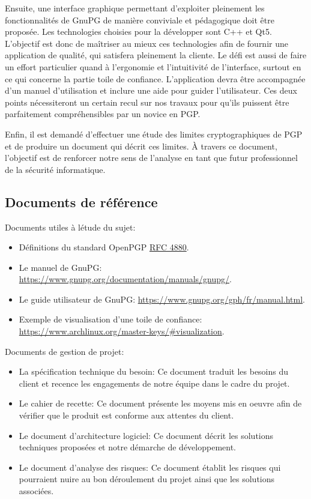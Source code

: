 \documentclass{../res/univ-projet}
\begin{document}
Ensuite, une interface graphique permettant d'exploiter pleinement les fonctionnalités de GnuPG de manière conviviale et pédagogique doit être 
proposée. Les technologies choisies pour la développer sont C++ et Qt5. L'objectif est donc de maîtriser au mieux ces technologies afin 
de fournir une application de qualité, qui satisfera pleinement la cliente. Le défi est aussi de faire un effort particulier quand à l'ergonomie 
et l'intuitivité de l'interface, surtout en ce qui concerne la partie toile de confiance. L'application devra être accompagnée d'un manuel 
d'utilisation et inclure une aide pour guider l'utilisateur. Ces deux points nécessiteront un certain recul sur nos travaux pour qu'ils 
puissent être parfaitement compréhensibles par un novice en PGP.

Enfin, il est demandé d'effectuer une étude des limites cryptographiques de PGP et de produire un document qui décrit ces limites. \`{A} travers 
ce document, l'objectif est de renforcer notre sens de l'analyse en tant que futur professionnel de la sécurité informatique.

\subsection{Documents de référence}

Documents utiles à létude du sujet: \\
\begin{itemize}
\item Définitions du standard OpenPGP \href{http://tools.ietf.org/html/rfc4880}{RFC 4880}.
\item Le manuel de GnuPG: \href{https://www.gnupg.org/documentation/manuals/gnupg/}{https://www.gnupg.org/documentation/manuals/gnupg/}.
\item Le guide utilisateur de GnuPG: \href{https://www.gnupg.org/gph/fr/manual.html}{https://www.gnupg.org/gph/fr/manual.html}.
\item Exemple de visualisation d'une toile de confiance: \href{https://www.archlinux.org/master-keys/#visualization}{https://www.archlinux.org/master-keys/\#visualization}. \\
\end{itemize}


Documents de gestion de projet: \\
\begin{itemize}
\item La spécification technique du besoin: Ce document traduit les besoins du client et recence les engagements de notre équipe dans le cadre du projet.
\item Le cahier de recette: Ce document présente les moyens mis en oeuvre afin de vérifier que le produit est conforme aux attentes du client.
\item Le document d'architecture logiciel: Ce document décrit les solutions techniques proposées et notre démarche de développement.
\item Le document d'analyse des risques: Ce document établit les risques qui pourraient nuire au bon déroulement du projet ainsi que les solutions associées.
\end{itemize}
\end{document}
